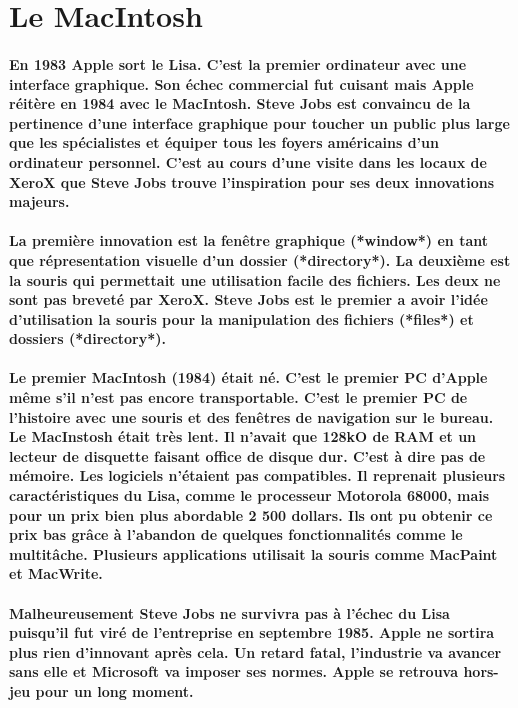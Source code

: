 \section*{Le MacIntosh}

\paragraph{
  En 1983 Apple sort le Lisa. C'est la premier ordinateur avec une interface graphique. Son échec commercial fut cuisant mais Apple réitère en 1984 avec le MacIntosh. Steve Jobs est convaincu de la pertinence d'une interface graphique pour toucher un public plus large que les spécialistes et équiper tous les foyers américains d'un ordinateur personnel. C'est au cours d'une visite dans les locaux de XeroX que Steve Jobs trouve l'inspiration pour ses deux innovations majeurs.
}

\paragraph{
  La première innovation est la fenêtre graphique (*window*) en tant que répresentation visuelle d'un dossier (*directory*). La deuxième est la souris qui permettait une utilisation facile des fichiers. Les deux ne sont pas breveté par XeroX. Steve Jobs est le premier a avoir l'idée d'utilisation la souris pour la manipulation des fichiers (*files*) et dossiers (*directory*).
}

\paragraph{
  Le premier MacIntosh (1984) était né. C'est le premier PC d'Apple même s'il n'est pas encore transportable. C'est le premier PC de l'histoire avec une souris et des fenêtres de navigation sur le bureau. Le MacInstosh était très lent. Il n'avait que 128kO de RAM et un lecteur de disquette faisant office de disque dur. C'est à dire pas de mémoire. Les logiciels n'étaient pas compatibles. Il reprenait plusieurs caractéristiques du Lisa, comme le processeur Motorola 68000, mais pour un prix bien plus abordable 2 500 dollars. Ils ont pu obtenir ce prix bas grâce à l'abandon de quelques fonctionnalités comme le multitâche. Plusieurs applications utilisait la souris comme MacPaint et MacWrite.
}

\paragraph{
  Malheureusement Steve Jobs ne survivra pas à l'échec du Lisa puisqu'il fut viré de l'entreprise en septembre 1985. Apple ne sortira plus rien d'innovant après cela. Un retard fatal, l'industrie va avancer sans elle et Microsoft va imposer ses normes. Apple se retrouva hors-jeu pour un long moment.
}

